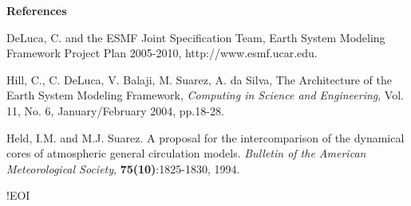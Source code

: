 \newpage

{\Large \bf References}


\begin{description}

\item DeLuca, C. and the ESMF Joint Specification Team, Earth System
Modeling Framework Project Plan 2005-2010, http://www.esmf.ucar.edu.

\item Hill, C., C. DeLuca, V. Balaji, M. Suarez, A. da Silva, The
Architecture of the Earth System Modeling Framework, {\em Computing in
Science and Engineering}, Vol. 11, No. 6, January/February 2004,
pp.18-28.

\item Held, I.M. and M.J. Suarez. A proposal for the intercomparison
  of the dynamical cores of atmospheric general circulation
  models. {\em Bulletin of the American Meteorological Society},
 {\bf 75(10)}:1825-1830, 1994.
 
\end{description} 



!EOI

